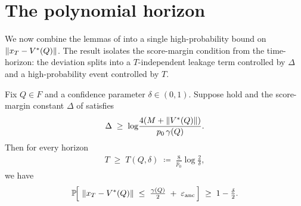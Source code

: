 \section{The polynomial horizon}
\label{sec:T_polynomial}

We now combine the lemmas of
into a single high-probability bound on $\left\| x_T - V^*(Q) \right\|$. The result
isolates the score-margin condition from the time-horizon: the deviation
splits into a $T$-independent leakage term controlled by $\Delta$ and a
high-probability event controlled by $T$.

\begin{lemma}\label{lem:T_polynomial}
Fix $Q \in F$ and a confidence parameter $\delta \in (0, 1)$. Suppose
hold and the score-margin constant $\Delta$ of 
satisfies
\begin{align}\label{eq:Delta_condition}
   \Delta \;\ge\; \log\!\frac{4(M + \left\| V^*(Q) \right\|)}{p_0\, \gamma(Q)}.
\end{align}
Then for every horizon
\begin{align}\label{eq:T_polynomial_def}
   T \;\ge\; T(Q, \delta)
   \;\coloneqq\; \frac{8}{p_0} \log\!\frac{2}{\delta},
\end{align}
we have
\begin{align}\label{eq:T_polynomial_conclusion}
   \mathbb{P}\!\Big[\, \left\| x_T - V^*(Q) \right\| \;\le\; \tfrac{\gamma(Q)}{2}
              \;+\; \varepsilon_{\mathrm{anc}} \,\Big]
   \;\ge\; 1 - \tfrac{\delta}{2}.
\end{align}
\end{lemma}


